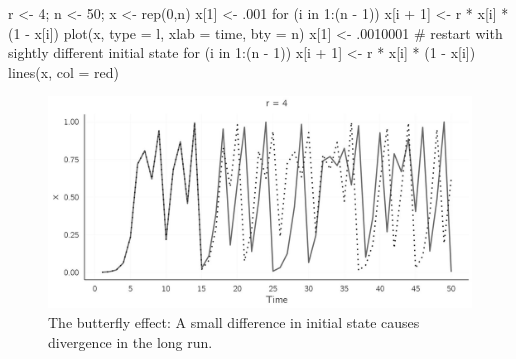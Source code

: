 \documentclass[
  a4paper,
  DIV=11,
  numbers=noendperiod,
  oneside]{scrreprt}
\newenvironment{Shaded}{\begin{snugshade}}{\end{snugshade}}
\newcommand{\AttributeTok}[1]{\textcolor[rgb]{0.40,0.45,0.13}{#1}}
\newcommand{\CommentTok}[1]{\textcolor[rgb]{0.37,0.37,0.37}{#1}}
\newcommand{\ControlFlowTok}[1]{\textcolor[rgb]{0.00,0.23,0.31}{#1}}
\newcommand{\DecValTok}[1]{\textcolor[rgb]{0.68,0.00,0.00}{#1}}
\newcommand{\FunctionTok}[1]{\textcolor[rgb]{0.28,0.35,0.67}{#1}}
\newcommand{\NormalTok}[1]{\textcolor[rgb]{0.00,0.23,0.31}{#1}}
\newcommand{\OtherTok}[1]{\textcolor[rgb]{0.00,0.23,0.31}{#1}}
\newcommand{\SpecialCharTok}[1]{\textcolor[rgb]{0.37,0.37,0.37}{#1}}
\newcommand{\StringTok}[1]{\textcolor[rgb]{0.13,0.47,0.30}{#1}}
\begin{document}
\begin{Shaded}
\begin{Highlighting}[]
\NormalTok{r }\OtherTok{\textless{}{-}} \DecValTok{4}\NormalTok{;  n }\OtherTok{\textless{}{-}} \DecValTok{50}\NormalTok{; x }\OtherTok{\textless{}{-}} \FunctionTok{rep}\NormalTok{(}\DecValTok{0}\NormalTok{,n)}
\NormalTok{x[}\DecValTok{1}\NormalTok{] }\OtherTok{\textless{}{-}}\NormalTok{ .}\DecValTok{001}
\ControlFlowTok{for}\NormalTok{ (i }\ControlFlowTok{in} \DecValTok{1}\SpecialCharTok{:}\NormalTok{(n }\SpecialCharTok{{-}} \DecValTok{1}\NormalTok{))}
\NormalTok{  x[i }\SpecialCharTok{+} \DecValTok{1}\NormalTok{] }\OtherTok{\textless{}{-}}\NormalTok{ r }\SpecialCharTok{*}\NormalTok{ x[i] }\SpecialCharTok{*}\NormalTok{ (}\DecValTok{1} \SpecialCharTok{{-}}\NormalTok{ x[i])}
\FunctionTok{plot}\NormalTok{(x, }\AttributeTok{type =} \StringTok{\textquotesingle{}l\textquotesingle{}}\NormalTok{, }\AttributeTok{xlab =} \StringTok{\textquotesingle{}time\textquotesingle{}}\NormalTok{, }\AttributeTok{bty =} \StringTok{\textquotesingle{}n\textquotesingle{}}\NormalTok{)}
\NormalTok{x[}\DecValTok{1}\NormalTok{] }\OtherTok{\textless{}{-}}\NormalTok{ .}\DecValTok{0010001}
\CommentTok{\# restart with sightly different initial state}
\ControlFlowTok{for}\NormalTok{ (i }\ControlFlowTok{in} \DecValTok{1}\SpecialCharTok{:}\NormalTok{(n }\SpecialCharTok{{-}} \DecValTok{1}\NormalTok{))}
\NormalTok{  x[i }\SpecialCharTok{+} \DecValTok{1}\NormalTok{] }\OtherTok{\textless{}{-}}\NormalTok{ r }\SpecialCharTok{*}\NormalTok{ x[i] }\SpecialCharTok{*}\NormalTok{ (}\DecValTok{1} \SpecialCharTok{{-}}\NormalTok{ x[i])}
\FunctionTok{lines}\NormalTok{(x, }\AttributeTok{col =} \StringTok{\textquotesingle{}red\textquotesingle{}}\NormalTok{)}
\end{Highlighting}
\end{Shaded}

\begin{figure}

{\centering \includegraphics{media/ch2/fig-ch2-img6.jpg}

}

\caption{\label{fig-ch2-img6}The butterfly effect: A small difference in
initial state causes divergence in the long run.}

\end{figure}
\end{document}
